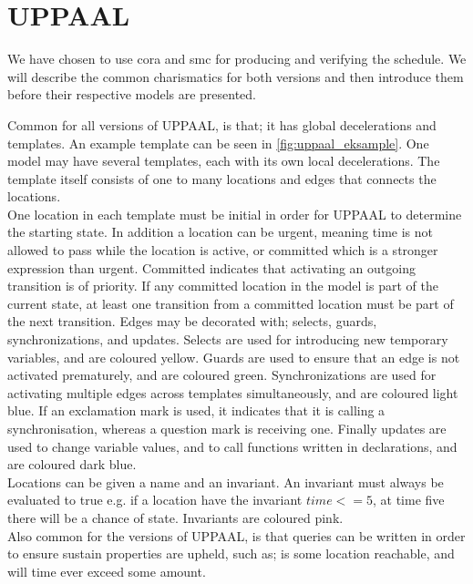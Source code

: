 \section{UPPAAL} \label{sec:uppaal}
We have chosen to use \acrlong{cora}\cite{cs_cora}\cite{cora_tutorial} and \acrlong{smc}\cite{smc_home}\cite{cs_smc} for producing and verifying the schedule. We will describe the common charismatics for both versions and then introduce them before their respective models are presented.

Common for all versions of UPPAAL, is that; it has global decelerations and templates. 
An example template can be seen in \cref{fig:uppaal_eksample}.
One model may have several templates, each with its own local decelerations. The template itself consists of one to many locations and edges that connects the locations.\\
One location in each template must be initial in order for UPPAAL to determine the starting state. In addition a location can be urgent, meaning time is not allowed to pass while the location is active, or committed which is a stronger expression than urgent. Committed indicates that activating an outgoing transition is of priority. If any committed location in the model is part of the current state, at least one transition from a committed location must be part of the next transition.
Edges may be decorated with; selects, guards, synchronizations, and updates. 
Selects are used for introducing new temporary variables, and are coloured yellow.
Guards are used to ensure that an edge is not activated prematurely, and are coloured green.
Synchronizations are used for activating multiple edges across templates simultaneously, and are coloured light blue. If an exclamation mark is used, it indicates that it is calling a synchronisation, whereas a question mark is receiving one.
Finally updates are used to change variable values, and to call functions written in declarations, and are coloured dark blue.\\
Locations can be given a name and an invariant. An invariant must always be evaluated to true e.g. if a location have the invariant $time <= 5$, at time five there will be a chance of state. Invariants are coloured pink.\\
Also common for the versions of UPPAAL, is that queries can be written in order to ensure sustain properties are upheld, such as; is some location reachable, and will time ever exceed some amount.

